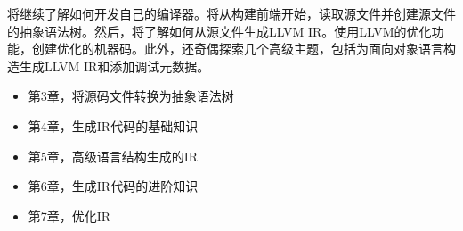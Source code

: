 将继续了解如何开发自己的编译器。将从构建前端开始，读取源文件并创建源文件的抽象语法树。然后，将了解如何从源文件生成LLVM IR。使用LLVM的优化功能，创建优化的机器码。此外，还奇偶探索几个高级主题，包括为面向对象语言构造生成LLVM IR和添加调试元数据。

\begin{itemize}
\item
第3章，将源码文件转换为抽象语法树

\item
第4章，生成IR代码的基础知识

\item
第5章，高级语言结构生成的IR

\item
第6章，生成IR代码的进阶知识

\item
第7章，优化IR
\end{itemize}